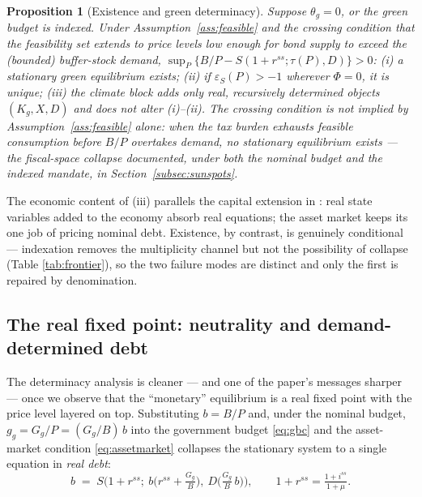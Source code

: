 \documentclass[12pt]{article}
\newtheorem{proposition}{Proposition}
\newcommand{\Sfun}{S}
\begin{document}
\begin{proposition}[Existence and green determinacy]\label{prop:determinacy}
Suppose $\theta_g=0$, or the green budget is indexed. Under
Assumption~\ref{ass:feasible} and the \emph{crossing condition} that the
feasibility set extends to price levels low enough for bond supply to exceed
the (bounded) buffer-stock demand, $\sup_{P}\{B/P - \Sfun(1+r^{ss};\tau(P),D)\}>0$:
(i) a stationary green equilibrium exists;
(ii) if $\varepsilon_S(P)>-1$ wherever $\Phi=0$, it is unique;
(iii) the climate block adds only real, recursively determined objects
$(K_g, X, D)$ and does not alter (i)--(ii).
The crossing condition is not implied by Assumption~\ref{ass:feasible} alone:
when the tax burden exhausts feasible consumption before $B/P$ overtakes
demand, no stationary equilibrium exists --- the fiscal-space collapse
documented, under both the nominal budget and the indexed mandate, in
Section~\ref{subsec:sunspots}.
\end{proposition}

The economic content of (iii) parallels the capital extension in
\citet{hagedorn2026dtpl}: real state variables added to the economy absorb
real equations; the asset market keeps its one job of pricing nominal debt.
Existence, by contrast, is genuinely conditional --- indexation removes the
multiplicity channel but not the possibility of collapse (Table
\ref{tab:frontier}), so the two failure modes are distinct and only the
first is repaired by denomination.

\subsection{The real fixed point: neutrality and demand-determined debt}
\label{subsec:neutrality}

The determinacy analysis is cleaner --- and one of the paper's messages
sharper --- once we observe that the ``monetary'' equilibrium is a real
fixed point with the price level layered on top. Substituting $b=B/P$ and,
under the nominal budget, $g_g=G_g/P=(G_g/B)\,b$ into the government budget
\eqref{eq:gbc} and the asset-market condition \eqref{eq:assetmarket}
collapses the stationary system to a single equation in \emph{real debt}:
\begin{equation}
b \;=\; \Sfun\!\Big(1+r^{ss};\ b\big(r^{ss}+\tfrac{G_g}{B}\big),\
D\big(\tfrac{G_g}{B}\,b\big)\Big),
\qquad 1+r^{ss}=\tfrac{1+i^{ss}}{1+\mu}.
\label{eq:realfp}
\end{equation}
\end{document}
